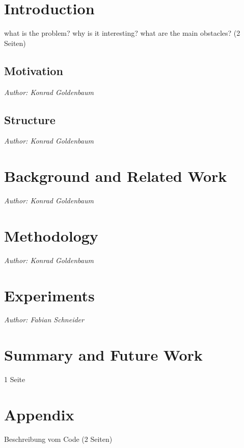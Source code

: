 \documentclass[
     12pt,         %
     a4paper,      %
     DIV=14,        %
     ]{scrreprt}
\begin{document}
\newpage

\tableofcontents
\cleardoublepage
{} 



\chapter{Introduction}
\label{chap:intro}
what is the problem? why is it interesting? what are the main obstacles? (2 Seiten)

\section{Motivation}
\textit{Author: Konrad Goldenbaum}
\newline


\section{Structure}
\textit{Author: Konrad Goldenbaum}
\newline


\newpage


\chapter{Background and Related Work}
\label{chap:background}
\textit{Author: Konrad Goldenbaum}


\chapter{Methodology}
\label{chap:methodology}
\textit{Author: Konrad Goldenbaum}


\chapter{Experiments}
\label{chap:experiments}
\textit{Author: Fabian Schneider}


\chapter{Summary and Future Work}
\label{chap:summary}
1 Seite


\chapter{Appendix}
\label{chap:appendix}
Beschreibung vom Code (2 Seiten)




\end{document}
